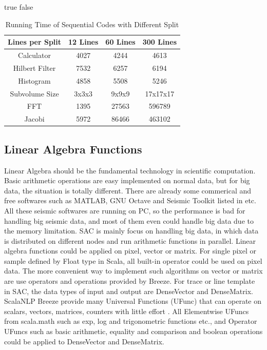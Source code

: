 \ifx true false
\begin{table}[h]
\caption{Running Time of Sequential Codes with Different Split}
\centering
\begin{tabular}{||c| c c c ||} 
 \hline
 Lines per Split & 12 Lines & 60 Lines & 300 Lines \\ [0.5ex] 
 \hline
 Calculator & 4027 & 4244 & 4613 \\ 
 Hilbert Filter & 7532 & 6257 & 6194 \\
 Histogram & 4858 & 5508 & 5246 \\
 \hline
 \hline
 Subvolume Size & 3x3x3 & 9x9x9 & 17x17x17 \\ [0.5ex] 
 \hline
 FFT & 1395 & 27563 & 596789 \\
 Jacobi & 5972 & 86466 & 463102 \\
 \hline
\end{tabular}
\label{table:CalcSpark}
\end{table}
\fi

\subsection{Linear Algebra Functions}
Linear Algebra should be the fundamental technology in scientific computation. Basic arithmetic operations are easy implemented on normal data, but for big data, the situation is totally different. There are already some commerical and free softwares such as MATLAB, GNU Octave and Seismic Toolkit listed in \cite{SeismicCalculator} etc. All these seismic softwares are running on PC, so the performance is bad for handling big seismic data, and most of them even could handle big data due to the memory limitation. SAC is mainly focus on handling big data, in which data is distributed on different nodes and run arithmetic functions in parallel. Linear algebra functions could be applied on pixel, vector or matrix. For single pixel or sample defined by Float type in Scala, all built-in operator could be used on pixel data. The more convenient way to implement such algorithms on vector or matrix are use operators and operations provided by Breeze. For trace or line template in SAC, the data types of input and output are DenseVector and DenseMatrix. ScalaNLP Breeze provide many Universal Functions (UFunc) that can operate on scalars, vectors, matrices, counters with little effort \cite{BreezeUFunc}. All Elementwise UFuncs from scala.math such as exp, log and trigonometric functions etc., and Operator UFuncs such as basic arithmetic, equality and comparison and boolean operations could be applied to DenseVector and DenseMatrix.  

